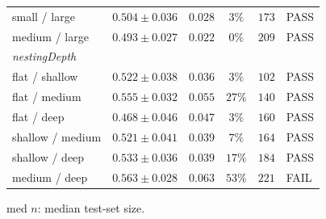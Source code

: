 \begin{table}[htbp]
\begin{tabular}{lccccl}
    small / large               & $0.504 \pm 0.036$ & $0.028$ & $3\%$  & $173$ & PASS \\
    medium / large              & $0.493 \pm 0.027$ & $0.022$ & $0\%$  & $209$ & PASS \\
    \midrule
    \multicolumn{6}{l}{\textit{nestingDepth}} \\
    flat / shallow              & $0.522 \pm 0.038$ & $0.036$ & $3\%$  & $102$ & PASS \\
    flat / medium               & $0.555 \pm 0.032$ & $0.055$ & $27\%$ & $140$ & PASS \\
    flat / deep                 & $0.468 \pm 0.046$ & $0.047$ & $3\%$  & $160$ & PASS \\
    shallow / medium            & $0.521 \pm 0.041$ & $0.039$ & $7\%$  & $164$ & PASS \\
    shallow / deep              & $0.533 \pm 0.036$ & $0.039$ & $17\%$ & $184$ & PASS \\
    medium / deep               & $0.563 \pm 0.028$ & $0.063$ & $53\%$ & $221$ & FAIL \\
    \bottomrule
  \end{tabular}

  \begin{tablenote}
    med $n$: median test-set size.
  \end{tablenote}
\end{table}
